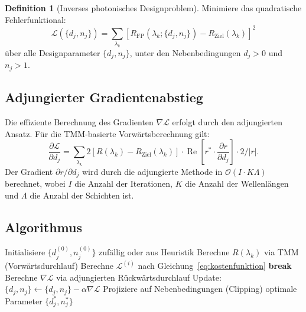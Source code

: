 ﻿\documentclass[a4paper,12pt]{scrreprt}
\theoremstyle{definition}
\newtheorem{definition}{Definition}[section]
\newcommand{\ordre}[1]{\mathcal{O}\!\left(#1\right)}
\newcommand{\Realteil}{\operatorname{Re}}
\begin{document}
\begin{definition}[Inverses photonisches Designproblem]
  Minimiere das quadratische Fehlerfunktional:
  \begin{equation}
    \mathcal{L}(\{d_j, n_j\}) = \sum_{\lambda_k}
    \left[R_\mathrm{FP}(\lambda_k; \{d_j, n_j\}) - R_\mathrm{Ziel}(\lambda_k)\right]^2
    \label{eq:kostenfunktion}
  \end{equation}
  über alle Designparameter $\{d_j, n_j\}$, unter den Nebenbedingungen
  $d_j > 0$ und $n_j > 1$.
\end{definition}

\subsection{Adjungierter Gradientenabstieg}

Die effiziente Berechnung des Gradienten $\nabla \mathcal{L}$ erfolgt durch
den adjungierten Ansatz. Für die TMM-basierte Vorwärtsberechnung gilt:
\begin{equation}
  \frac{\partial \mathcal{L}}{\partial d_j} = \sum_{\lambda_k}
  2\left[R(\lambda_k) - R_\mathrm{Ziel}(\lambda_k)\right]
  \cdot \Realteil\left[r^* \cdot \frac{\partial r}{\partial d_j}\right] \cdot 2/|r|.
\end{equation}
Der Gradient $\partial r / \partial d_j$ wird durch die adjungierte Methode
in $\ordre{I \cdot K\Lambda}$ berechnet, wobei $I$ die Anzahl der
Iterationen, $K$ die Anzahl der Wellenlängen und $\Lambda$ die Anzahl der
Schichten ist.

\subsection{Algorithmus}

\begin{algorithm}[H]
  \caption{Adjungierter Gradientenabstieg für inverses photonisches Design}
  \begin{algorithmic}[1]
    \State Initialisiere $\{d_j^{(0)}, n_j^{(0)}\}$ zufällig oder aus Heuristik
      \State Berechne $R(\lambda_k)$ via TMM (Vorwärtsdurchlauf)
      \State Berechne $\mathcal{L}^{(i)}$ nach Gleichung~\eqref{eq:kostenfunktion}
       \textbf{break} \EndIf
      \State Berechne $\nabla \mathcal{L}$ via adjungierten Rückwärtsdurchlauf
      \State Update: $\{d_j, n_j\} \leftarrow \{d_j, n_j\} - \alpha \nabla \mathcal{L}$
      \State Projiziere auf Nebenbedingungen (Clipping)
    \EndFor
    \State \Return optimale Parameter $\{d_j^*, n_j^*\}$
  \end{algorithmic}
\end{algorithm}
\end{document}
